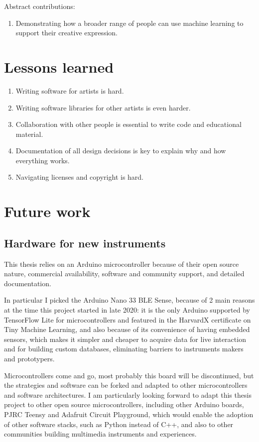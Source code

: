 Abstract contributions:

\begin{enumerate}
 \item Demonstrating how a broader range of people can use machine learning to support their creative expression.
\end{enumerate}

\section{Lessons learned}

\begin{enumerate}
  \item Writing software for artists is hard.
  \item Writing software libraries for other artists is even harder.
  \item Collaboration with other people is essential to write code and educational material.
  \item Documentation of all design decisions is key to explain why and how everything works.
  \item Navigating licenses and copyright is hard.
\end{enumerate}

\section{Future work}

\subsection{Hardware for new instruments}

This thesis relies on an Arduino microcontroller because of their open source nature, commercial availability, software and community support, and detailed documentation.

In particular I picked the Arduino Nano 33 BLE Sense, because of 2 main reasons at the time this project started in late 2020: it is the only Arduino supported by TensorFlow Lite for microcontrollers and featured in the HarvardX certificate on Tiny Machine Learning, and also because of its convenience of having embedded sensors, which makes it simpler and cheaper to acquire data for live interaction and for building custom databases, eliminating barriers to instruments makers and prototypers.

Microcontrollers come and go, most probably this board will be discontinued, but the strategies and software can be forked and adapted to other microcontrollers and software architectures. I am particularly looking forward to adapt this thesis project to other open source microcontrollers, including other Arduino boards, PJRC Teensy and Adafruit Circuit Playground, which would enable the adoption of other software stacks, such as Python instead of C++, and also to other communities building multimedia instruments and experiences.


